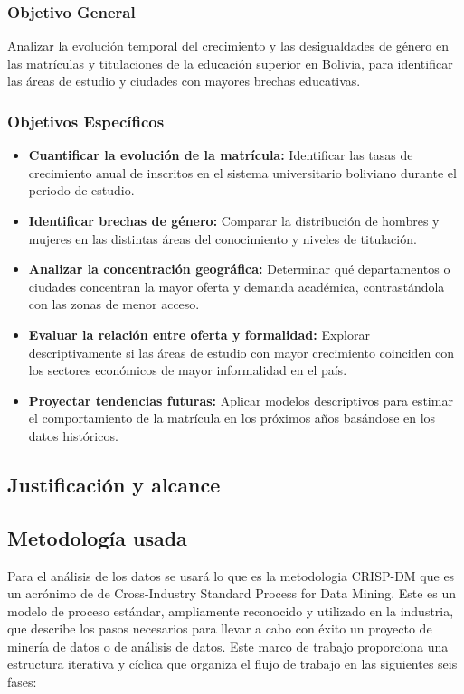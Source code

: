\documentclass[10pt, twocolumn]{article}
\begin{document}
\subsubsection{Objetivo General}
Analizar la evolución temporal del crecimiento y las desigualdades de género en las matrículas y titulaciones de la educación superior en Bolivia, para identificar las áreas de estudio y ciudades con mayores brechas educativas.

\subsubsection{Objetivos Específicos}

\begin{itemize}
    \item \textbf{Cuantificar la evolución de la matrícula:} Identificar las tasas de crecimiento anual de inscritos en el sistema universitario boliviano durante el periodo de estudio.
    \item \textbf{Identificar brechas de género:} Comparar la distribución de hombres y mujeres en las distintas áreas del conocimiento y niveles de titulación.
    \item \textbf{Analizar la concentración geográfica:} Determinar qué departamentos o ciudades concentran la mayor oferta y demanda académica, contrastándola con las zonas de menor acceso.
    \item \textbf{Evaluar la relación entre oferta y formalidad:} Explorar descriptivamente si las áreas de estudio con mayor crecimiento coinciden con los sectores económicos de mayor informalidad en el país.
    \item \textbf{Proyectar tendencias futuras:} Aplicar modelos descriptivos para estimar el comportamiento de la matrícula en los próximos años basándose en los datos históricos.
\end{itemize}

\subsection{Justificación y alcance}

\lipsum[1][1]

\subsection{Metodología usada}

Para el análisis de los datos se usará lo que es la metodologia CRISP-DM que es un acrónimo de de Cross-Industry Standard Process for Data Mining. Este es un modelo de proceso estándar, ampliamente reconocido y utilizado en la industria, que describe los pasos necesarios para llevar a cabo con éxito un proyecto de minería de datos o de análisis de datos. Este marco de trabajo proporciona una estructura iterativa y cíclica que organiza el flujo de trabajo en las siguientes seis fases:
\end{document}
